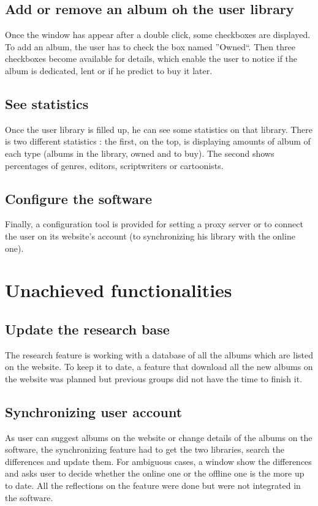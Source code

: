 \documentclass[11pt]{report} %
\begin{document}
\subsection{Add or remove an album oh the user library}
Once the window has appear after a double click, some checkboxes are displayed. To add an album, the user has to check the box named ''Owned``. Then three checkboxes become available for details, which  enable the user to notice if the album is dedicated, lent or if he predict to buy it later.

\subsection{See statistics}
Once the user library is filled up, he can see some statistics on that library. There is two different statistics : the first, on the top, is displaying amounts of album of each type (albums in the library, owned and to buy). The second shows percentages of genres, editors, scriptwriters or cartoonists.

\subsection{Configure the software}
Finally, a configuration tool is provided for setting a proxy server or to connect the user on its website's account (to synchronizing his library with the online one).

\section{Unachieved functionalities}
\subsection{Update the research base}
The research feature is working with a database of all the albums which are listed on the website. To keep it to date, a feature that download all the new albums on the website was planned but previous groups did not have the time to finish it.

\subsection{Synchronizing user account}
As user can suggest albums on the website or change details of the albums on the software, the synchronizing feature had to get the two libraries, search the differences and update them. For ambiguous cases, a window show the differences and asks user to decide whether the online one or the offline one is the more up to date. All the reflections on the feature were done but were not integrated in the software.
\end{document}
